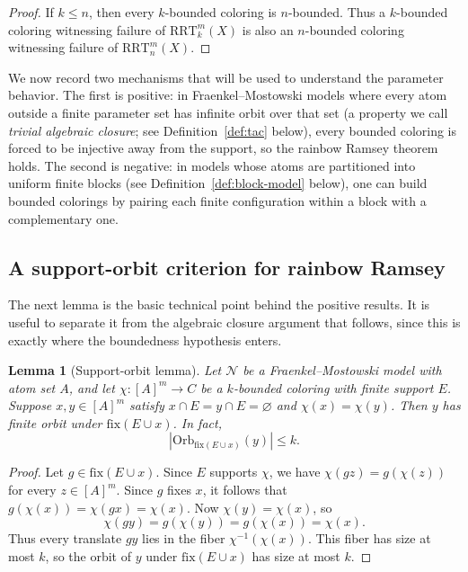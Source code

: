 \documentclass[11pt]{amsart}
\newtheorem{lemma}[theorem]{Lemma}
\theoremstyle{definition}
\newcommand{\RRT}{\mathrm{RRT}}
\newcommand{\NN}{\mathcal{N}}
\begin{document}
\begin{proof}
If \(k\leq n\), then every \(k\)-bounded coloring is \(n\)-bounded.  Thus a \(k\)-bounded coloring witnessing failure of \(\RRT^m_k(X)\) is also an \(n\)-bounded coloring witnessing failure of \(\RRT^m_n(X)\).
\end{proof}

We now record two mechanisms that will be used to understand the parameter behavior.  The first is positive: in Fraenkel--Mostowski models where every atom outside a finite parameter set has infinite orbit over that set (a property we call \emph{trivial algebraic closure}; see Definition~\ref{def:tac} below), every bounded coloring is forced to be injective away from the support, so the rainbow Ramsey theorem holds.  The second is negative: in models whose atoms are partitioned into uniform finite blocks (see Definition~\ref{def:block-model} below), one can build bounded colorings by pairing each finite configuration within a block with a complementary one.

\subsection{A support-orbit criterion for rainbow Ramsey}

The next lemma is the basic technical point behind the positive results.  It is useful to separate it from the algebraic closure argument that follows, since this is exactly where the boundedness hypothesis enters.

\begin{lemma}[Support-orbit lemma]
Let \(\NN\) be a Fraenkel--Mostowski model with atom set \(A\), and let \(\chi:[A]^m\to C\) be a \(k\)-bounded coloring with finite support \(E\).  Suppose \(x,y\in[A]^m\) satisfy \(x\cap E=y\cap E=\varnothing\) and \(\chi(x)=\chi(y)\).  Then \(y\) has finite orbit under \(\mathrm{fix}(E\cup x)\).  In fact,
\[
    \left|\mathrm{Orb}_{\mathrm{fix}(E\cup x)}(y)\right|\leq k.
\]
\end{lemma}

\begin{proof}
Let \(g\in\mathrm{fix}(E\cup x)\).  Since \(E\) supports \(\chi\), we have \(\chi(gz)=g(\chi(z))\) for every \(z\in[A]^m\).  Since \(g\) fixes \(x\), it follows that \(g(\chi(x))=\chi(gx)=\chi(x)\).  Now \(\chi(y)=\chi(x)\), so
\[
    \chi(gy)=g(\chi(y))=g(\chi(x))=\chi(x).
\]
Thus every translate \(gy\) lies in the fiber \(\chi^{-1}(\chi(x))\).  This fiber has size at most \(k\), so the orbit of \(y\) under \(\mathrm{fix}(E\cup x)\) has size at most \(k\).
\end{proof}
\end{document}
